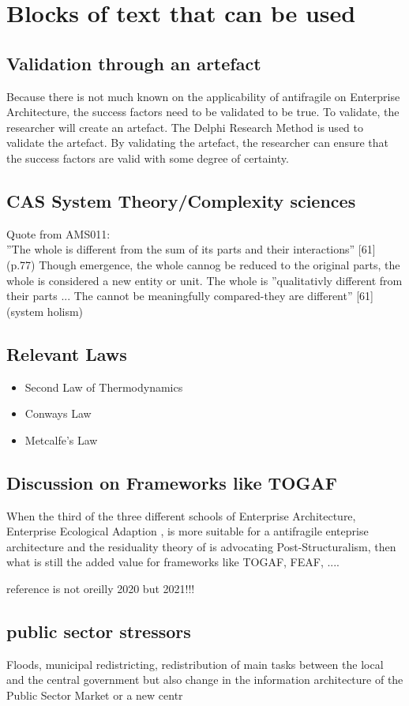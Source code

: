 \chapter{Blocks of text that can be used}

\section{Validation through an artefact}
Because there is not much known on the applicability of antifragile on Enterprise Architecture, the success factors need to be validated to be true. To validate, the researcher will create an artefact. The Delphi Research Method is used to validate the artefact. By validating the artefact, the researcher can ensure that the success factors are valid with some degree of certainty.\\

\section{CAS System Theory/Complexity sciences}
Quote from AMS011:\\
''The whole is different from the sum of its parts and their interactions'' [61] (p.77) Though emergence, the whole cannog be reduced to the original parts, the whole is considered a new entity or unit. The whole is ''qualitativly different from their parts ... The cannot be meaningfully compared-they are different'' [61] (system holism)

\section{Relevant Laws}
\begin{itemize}
	\item{Second Law of Thermodynamics}
	\item{Conways Law}
	\item{Metcalfe's Law}
\end{itemize}

\section{Discussion on Frameworks like TOGAF}
When the third of the three different schools of Enterprise Architecture, Enterprise Ecological Adaption \parencite{Lapalme2012}, is more suitable for a antifragile enteprise architecture and the residuality theory of \textcite[p. 809]{OReilly2021} is advocating Post-Structuralism, then what is still the added value for frameworks like TOGAF, FEAF, ....
\begin{remark}
reference is not oreilly 2020 but 2021!!!
\end{remark}

\section{public sector stressors}
Floods, municipal redistricting, redistribution of main tasks between the local and the central government but also change in the information architecture of the Public Sector Market or a new centr